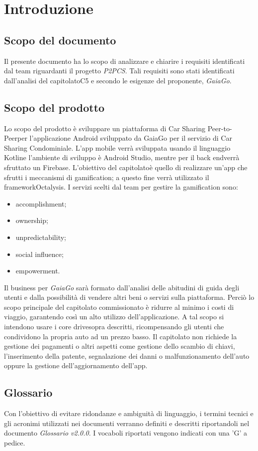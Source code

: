 \section{Introduzione} 
\subsection{Scopo del documento}
Il presente documento ha lo scopo di analizzare e chiarire i requisiti identificati dal team riguardanti il progetto \textit{P2PCS}. Tali requisiti sono stati identificati dall'analisi del capitolato\glosp C5 e secondo le esigenze del proponente, \textit{GaiaGo}.
\subsection{Scopo del prodotto}
Lo scopo del prodotto è sviluppare un piattaforma di Car Sharing Peer-to-Peer\glosp  per l'applicazione Android sviluppato da GaiaGo per il servizio di Car Sharing Condominiale. L'app mobile verrà sviluppata usando il linguaggio Kotlin\glosp e l'ambiente di sviluppo è Android Studio, mentre per il back end\glosp verrà sfruttato un Firebase\glo. L'obiettivo del capitolato\glosp è quello di realizzare un'app che sfrutti i meccanismi di gamification\glo; a questo fine verrà utilizzato il framework\glosp Octalysis\glo. I servizi scelti dal team per gestire la gamification sono:
\begin{itemize}
	\item {accomplishment};
	\item {ownership};
	\item {unpredictability};
	\item {social influence};
	\item {empowerment}.
\end{itemize}
Il business per \textit{GaiaGo} sarà formato dall'analisi delle abitudini di guida degli utenti e dalla possibilità di vendere altri beni o servizi sulla piattaforma. Perciò lo scopo principale del capitolato commissionato è ridurre al minimo i costi di viaggio, garantendo così un alto utilizzo dell'applicazione. 
A tal scopo si intendono usare i core drive\glosp sopra descritti, ricompensando gli utenti che condividono la propria auto ad un prezzo basso. Il capitolato non richiede la gestione dei pagamenti o altri aspetti come gestione dello scambio di chiavi, l'inserimento della patente, segnalazione dei danni o malfunzionamento dell'auto oppure la gestione dell'aggiornamento dell'app.

\subsection{Glossario}
Con l’obiettivo di evitare ridondanze e ambiguità di linguaggio, i termini tecnici e gli acronimi utilizzati nei documenti verranno definiti e descritti riportandoli nel documento \textit{Glossario v2.0.0}.  I vocaboli riportati vengono indicati con una 'G' a pedice.
